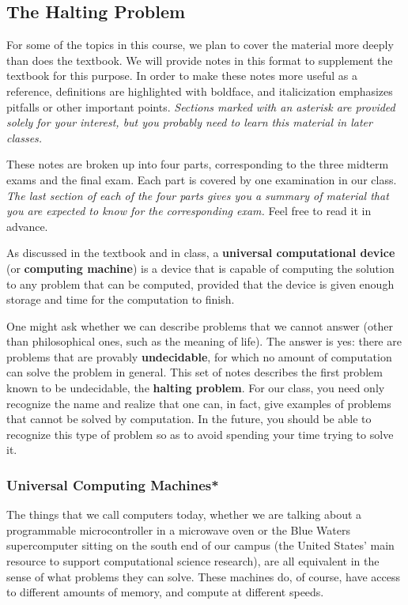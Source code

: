 \classtitle

\subsection{The Halting Problem}

For some of the topics in this course, we plan to cover the material
more deeply than does the textbook.  We will provide notes in this
format to supplement the textbook for this purpose.
%
In order to make these notes more useful as a reference, definitions are
highlighted with boldface, and italicization emphasizes pitfalls or other
important points.
%
{\em Sections marked with an asterisk are provided solely for your
interest, but you probably need to learn this material in later classes.}

These notes are broken up into four parts, corresponding to the three
midterm exams and the final exam.  Each part is covered by
one examination in our class.  {\it The last section of each of the four
parts gives you
a summary of material that you are expected to know for the corresponding
exam.}  Feel
free to read it in advance.

As discussed in the textbook and in class, a {\bf universal
computational device} (or {\bf computing machine})\label{one:hm:ucd} is a device 
that is capable of computing the
solution to any problem that can be computed, provided that the device
is given enough storage and time for the computation to finish.  

One might ask whether we can describe problems that we cannot answer (other 
than philosophical ones, such as the meaning of life).
%
The answer is yes: there are problems that are provably {\bf undecidable}\label{one:hm:undecidable},
for which no amount of computation can solve the problem in general.
This set of notes describes the first problem known to be
undecidable, the {\bf halting problem}\label{one:hm:haltingprob}.  For our class, you need only recognize
the name and realize that one can, in fact, give examples of problems
that cannot be solved by computation.  In the future, you should be able
to recognize this type of problem so as to avoid spending your time
trying to solve it.\\

\subsubsection{Universal Computing Machines*}

The things that we call computers today, whether we are talking about
a programmable microcontroller in a microwave oven or the Blue Waters
supercomputer sitting on the south end of our campus (the United
States' main resource to support computational science research), are
all equivalent in the sense of what problems they can solve.  
%
These machines do, of course, have access to different amounts of memory, 
and compute at different speeds.  


